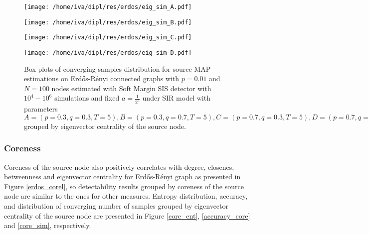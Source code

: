 \documentclass[times, utf8, diplomski]{fer}
\begin{document}
\begin{figure}[H]
\begin{minipage}{\textwidth}
\begin{minipage}{0.5\textwidth}
\texttt{[image: /home/iva/dipl/res/erdos/eig\_sim\_A.pdf]}
\end{minipage}
\begin{minipage}{0.5\textwidth}
\texttt{[image: /home/iva/dipl/res/erdos/eig\_sim\_B.pdf]}
\end{minipage}
\begin{minipage}{0.5\textwidth}
\texttt{[image: /home/iva/dipl/res/erdos/eig\_sim\_C.pdf]}
\end{minipage}
\begin{minipage}{0.5\textwidth}
\texttt{[image: /home/iva/dipl/res/erdos/eig\_sim\_D.pdf]}
\end{minipage}
\caption{Box plots of converging samples distribution for source MAP estimations on  Erd{\H{o}}s-R{\'{e}}nyi connected graphs with $p=0.01$ and $N=100$ nodes estimated with Soft Margin SIS detector with $10^4 - 10^6$ simulations and fixed $a = \frac{1}{2^5}$ under SIR model with parameters $A = (p=0.3, q=0.3, T=5), B = (p=0.3, q=0.7, T=5), C = (p=0.7, q=0.3, T=5), D = (p=0.7, q=0.7, T=5)$ grouped by eigenvector centrality of the source node.}
\label{erdos_eig_sim}
\end{minipage}
\end{figure}

\subsubsection{Coreness}
Coreness of the source node also positively correlates with degree, closenes, betweenness and eigenvector centrality for  Erd{\H{o}}s-R{\'{e}}nyi graph as presented in Figure \ref{erdos_corel}, so detectability  results grouped by coreness of the source node are similar to the ones for other measures. Entropy distribution, accuracy, and distribution of converging number of samples grouped by eigenvector centrality of the source node are presented in Figure \ref{core_ent}, \ref{accuracy_core} and \ref{core_sim}, respectively.
\end{document}
